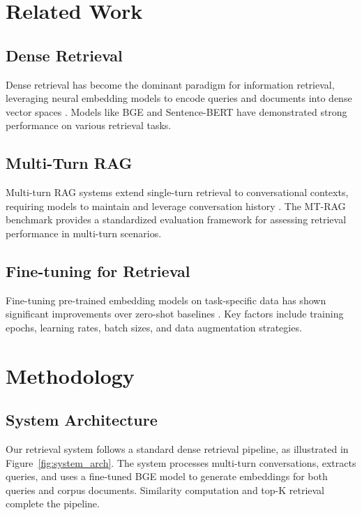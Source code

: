 \documentclass[conference]{IEEEtran}
\begin{document}
\section{Related Work}

\subsection{Dense Retrieval}
Dense retrieval has become the dominant paradigm for information retrieval, leveraging neural embedding models to encode queries and documents into dense vector spaces \cite{karpukhin2020dense}. Models like BGE \cite{bge2023} and Sentence-BERT \cite{reimers2019sentence} have demonstrated strong performance on various retrieval tasks.

\subsection{Multi-Turn RAG}
Multi-turn RAG systems extend single-turn retrieval to conversational contexts, requiring models to maintain and leverage conversation history \cite{multirag2024}. The MT-RAG benchmark provides a standardized evaluation framework for assessing retrieval performance in multi-turn scenarios.

\subsection{Fine-tuning for Retrieval}
Fine-tuning pre-trained embedding models on task-specific data has shown significant improvements over zero-shot baselines \cite{thakur2021beir}. Key factors include training epochs, learning rates, batch sizes, and data augmentation strategies.

\section{Methodology}

\subsection{System Architecture}

Our retrieval system follows a standard dense retrieval pipeline, as illustrated in Figure~\ref{fig:system_arch}. The system processes multi-turn conversations, extracts queries, and uses a fine-tuned BGE model to generate embeddings for both queries and corpus documents. Similarity computation and top-K retrieval complete the pipeline.
\end{document}

